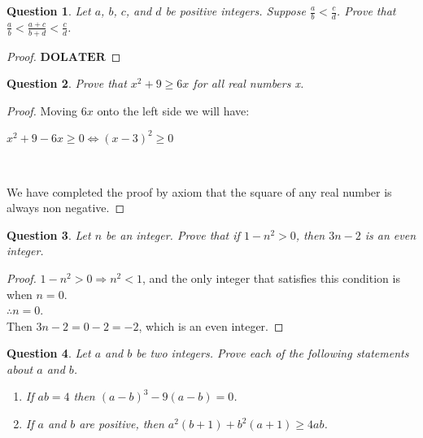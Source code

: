 \documentclass[11pt,oneside]{article}
\newtheorem{question}{Question}
\begin{document}
\bigskip

\begin{question}
    Let $a$, $b$, $c$, and $d$ be positive integers. Suppose $\frac{a}{b} < \frac{c}{d}$. Prove that $\frac{a}{b} < \frac{a+c}{b+d} < \frac{c}{d}$.\\
\end{question}

\begin{proof}
   $\mathbf{DO LATER}$
\end{proof}

\newpage

\begin{question}
    Prove that $x^2 + 9 \geq 6x$ for all real numbers x.
\end{question}

\begin{proof}
    Moving $6x$ onto the left side we will have: \\
    
    \centerline{$x^2 + 9 - 6x \geq 0 \iff
    	(x-3)^2 \geq 0$}\

    We have completed the proof by axiom that the square of any real number is always non negative.   
    
\end{proof}

\bigskip

\begin{question}
    Let $n$ be an integer. Prove that if $1 - n^2 > 0$, then $3n - 2$ is an even integer.
\end{question}

\begin{proof}
    $1 - n^2 > 0 \Rightarrow n^2 < 1$, and the only integer that satisfies this condition is when $n = 0$.\\
    $\therefore n = 0$.\\
    Then $3n - 2 = 0 - 2 = -2$, which is an even integer.
\end{proof}

\bigskip

\begin{question}
    Let $a$ and $b$ be two integers. Prove each of the following statements about $a$ and $b$. \\
    \begin{enumerate}
    	\item[(a)] If $ab = 4$ then $(a-b)^3 - 9(a-b) = 0$.
    	\item[(b)] If $a$ and $b$ are positive, then $a^2(b+1) + b^2(a+1) \geq 4ab$.  
    \end{enumerate}
\end{question}
\end{document}
